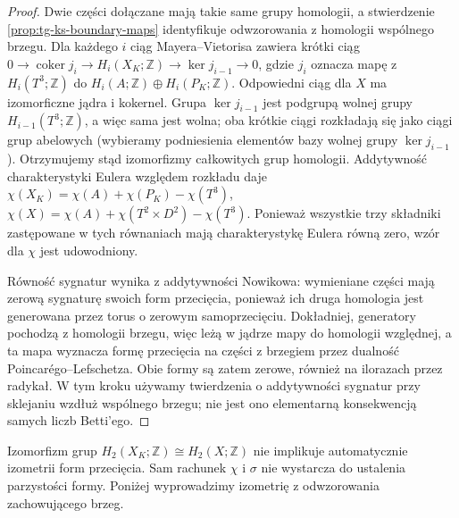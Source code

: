 \begin{proof}
Dwie części dołączane mają takie same grupy homologii,
a stwierdzenie \ref{prop:tg-ks-boundary-maps} identyfikuje
odwzorowania z homologii wspólnego brzegu.
Dla każdego $i$ ciąg Mayera--Vietorisa zawiera krótki ciąg
$0\to\operatorname{coker}j_i\to H_i(X_K;\mathbb Z)
\to\ker j_{i-1}\to0$, gdzie $j_i$ oznacza mapę z
$H_i(T^3;\mathbb Z)$ do $H_i(A;\mathbb Z)\oplus H_i(P_K;\mathbb Z)$.
Odpowiedni ciąg dla $X$ ma izomorficzne jądra i kokernel.
Grupa $\ker j_{i-1}$ jest podgrupą wolnej grupy
$H_{i-1}(T^3;\mathbb Z)$, a więc sama jest wolna;
oba krótkie ciągi rozkładają się jako ciągi grup
abelowych (wybieramy podniesienia elementów bazy
wolnej grupy $\ker j_{i-1}$).
Otrzymujemy stąd izomorfizmy całkowitych grup homologii. Addytywność charakterystyki Eulera
względem rozkładu daje
$\chi(X_K)=\chi(A)+\chi(P_K)-\chi(T^3)$,
$\chi(X)=\chi(A)+\chi(T^2\times D^2)-\chi(T^3)$.
Ponieważ wszystkie trzy składniki zastępowane w tych
równaniach mają charakterystykę Eulera równą zero,
wzór dla $\chi$ jest udowodniony.

Równość sygnatur wynika z addytywności Nowikowa:
wymieniane części mają zerową sygnaturę swoich form
przecięcia, ponieważ ich druga homologia jest
generowana przez torus o zerowym samoprzecięciu.
Dokładniej, generatory pochodzą z homologii brzegu,
więc leżą w jądrze mapy do homologii względnej,
a ta mapa wyznacza formę przecięcia na części
z brzegiem przez dualność Poincarégo--Lefschetza.
Obie formy są zatem zerowe, również na ilorazach
przez radykał.
W tym kroku używamy twierdzenia o addytywności
sygnatur przy sklejaniu wzdłuż wspólnego brzegu;
nie jest ono elementarną konsekwencją samych
liczb Betti'ego.
\end{proof}

\begin{uwaga}
Izomorfizm grup $H_2(X_K;\mathbb Z)\cong H_2(X;\mathbb Z)$
nie implikuje automatycznie izometrii form przecięcia.
Sam rachunek $\chi$ i $\sigma$ nie wystarcza do
ustalenia parzystości formy. Poniżej wyprowadzimy
izometrię z odwzorowania zachowującego brzeg.
\end{uwaga}

